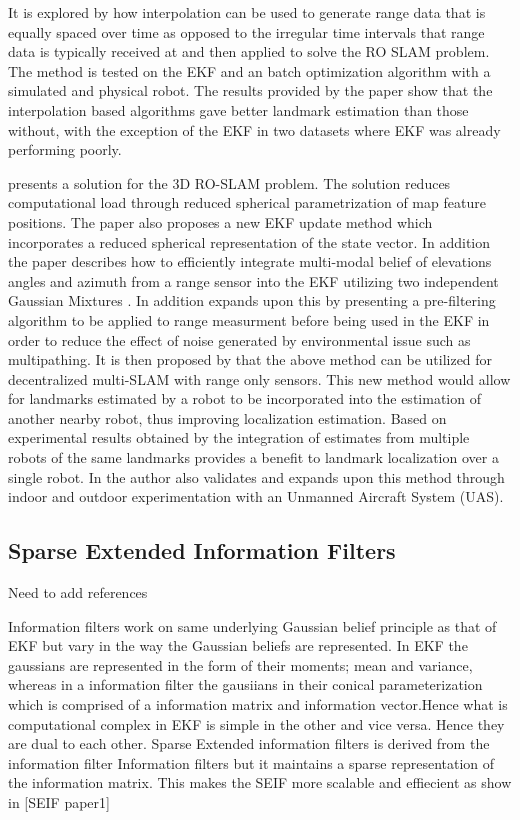 \documentclass[conference]{IEEEtran}
\begin{document}
	
	
	
	It is explored by \cite{Kehagias2006} how interpolation can be used to generate range data that is equally spaced over time as opposed to the irregular time intervals that range data is typically received at and then applied to solve the RO SLAM problem. The method is tested on the EKF and an batch optimization algorithm with a simulated and physical robot. The results provided by the paper show that the interpolation based algorithms gave better landmark estimation than those without, with the exception of the EKF in two datasets where EKF was already performing poorly.
	
	
	
	
	
	\cite{Fabresse2013} presents a solution for the 3D RO-SLAM problem. The solution reduces computational load through reduced spherical parametrization of map feature positions. The paper also proposes a new EKF update method which incorporates a reduced spherical representation of the state vector. In addition the paper describes how to efficiently integrate multi-modal belief of elevations angles and azimuth from a range sensor into the EKF utilizing two independent Gaussian Mixtures \cite{Fabresse2013}. In addition \cite{Fabresse2014} expands upon this by presenting a pre-filtering algorithm to be applied to range measurment before being used in the EKF in order to reduce the effect of noise generated by environmental issue such as multipathing. It is then proposed by \cite{Fabresse2015} that the above method can be utilized for decentralized multi-SLAM with range only sensors. This new method would allow for landmarks estimated by a robot to be incorporated into the estimation of another nearby robot, thus improving localization estimation. Based on experimental results obtained by \cite{Fabresse2015} the integration of estimates from multiple robots of the same landmarks provides a benefit to landmark localization over a single robot. In \cite{Fabresse2016} the author also validates and expands upon this method through indoor and outdoor experimentation with an Unmanned Aircraft System (UAS).  
	
	
	\subsection{Sparse Extended Information Filters}
	Need to add references
	
	Information filters work on same underlying Gaussian belief principle as that of EKF but vary in the way the Gaussian beliefs are represented. In EKF the gaussians are represented in the form of their moments; mean and 	variance, whereas in a information filter the gausiians in their conical parameterization which is comprised of a information matrix and information vector.Hence what is computational complex in EKF is simple in the other and vice versa. Hence they are dual to each other.
	Sparse Extended information filters is derived from the information filter Information filters but it maintains a sparse representation of the information matrix. This makes the SEIF more scalable and effiecient as show in [SEIF paper1] 
	
\end{document}
